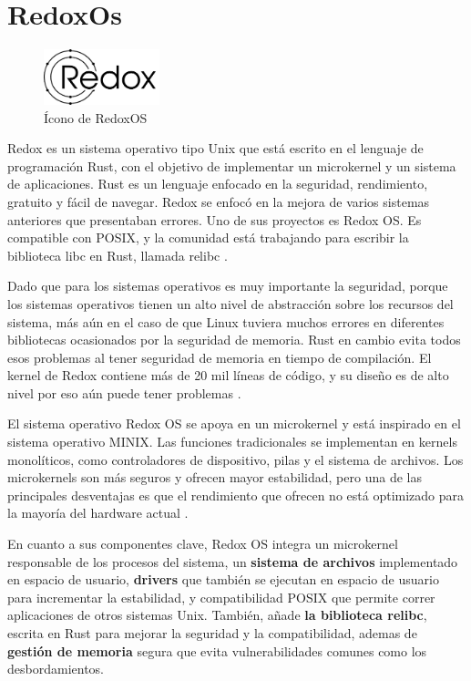 \section{RedoxOs}
\begin{figure}[H]
    \centering
    \includegraphics[width=0.3\textwidth]{figures/RedoxOs.png}
    \caption[Ícono de RedoxOS]%
            {Ícono de RedoxOS \citep{WikiRedoxOS}}
    \label{fig:sistema_operativo_redoxos}
\end{figure}
Redox es un sistema operativo tipo Unix que está escrito en el lenguaje de programación Rust, con el objetivo de implementar un microkernel y un sistema de aplicaciones. Rust es un lenguaje enfocado en la seguridad, rendimiento, gratuito y fácil de navegar. Redox se enfocó en la mejora de varios sistemas anteriores que presentaban errores. Uno de sus proyectos es Redox OS. Es compatible con POSIX, y la comunidad está trabajando para escribir la biblioteca libc en Rust, llamada relibc \citep{Saini2018}.

Dado que para los sistemas operativos es muy importante la seguridad, porque los sistemas operativos tienen un alto nivel de abstracción sobre los recursos del sistema, más aún en el caso de que Linux tuviera muchos errores en diferentes bibliotecas ocasionados por la seguridad de memoria. Rust en cambio evita todos esos problemas al tener seguridad de memoria en tiempo de compilación. El kernel de Redox contiene más de 20 mil líneas de código, y su diseño es de alto nivel por eso aún puede tener problemas \citep{Ellmann2019}.

El sistema operativo Redox OS se apoya en un microkernel y está inspirado en el sistema operativo MINIX. Las funciones tradicionales se implementan en kernels monolíticos, como controladores de dispositivo, pilas y el sistema de archivos. Los microkernels son más seguros y ofrecen mayor estabilidad, pero una de las principales desventajas es que el rendimiento que ofrecen no está optimizado para la mayoría del hardware actual \citep{Ritter2019}.

En cuanto a sus componentes clave, Redox OS integra un microkernel responsable de los procesos del sistema, un \textbf{sistema de archivos} implementado en espacio de usuario, \textbf{drivers} que también se ejecutan en espacio de usuario para incrementar la estabilidad, y compatibilidad POSIX que permite correr aplicaciones de otros sistemas Unix. También, añade \textbf{la biblioteca relibc}, escrita en Rust para mejorar la seguridad y la compatibilidad, ademas de \textbf{gestión de memoria} segura que evita vulnerabilidades comunes como los desbordamientos\citep{RedoxOS_book}.